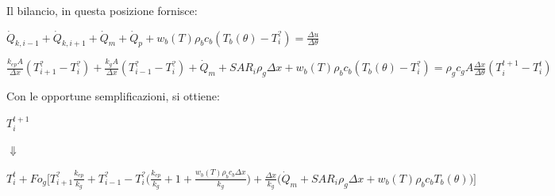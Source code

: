 Il bilancio, in questa posizione fornisce:
\begin{center}
	$ \Dot{Q} _{k, i-1} +\Dot{Q} _{k, i+1}+ \Dot{Q} _{m} +\Dot{Q} _{p}+ w_b (T) \rho _b c_b (T_b(\theta)-T_i ^?)= \frac{\Delta u}{\Delta \theta} $
\end{center}
\vspace{0.15cm}
\begin{center}
	$ \frac{k_{ep} A }{\Delta x}(T_{i+1} ^? - T_i ^? ) + \frac{k_g A }{\Delta x}(T_{i-1} ^? - T_i ^? )+ \Dot{Q} _{m} + SAR_i\rho _g \Delta x + w_b (T) \rho _b c_b (T_b(\theta)-T_i ^?) = \rho _{g} c_{g} A \frac{\Delta x}{ \Delta \theta}(T_i ^{t+1} - T_i ^t ) $
\end{center}
Con le opportune semplificazioni, si ottiene:
\begin{center}
	$T_i ^{t+1} $
\end{center}
\begin{center}
	$\Downarrow$
\end{center}
\begin{center}
	$T_i ^t + Fo_{g} \Bigg[ T_{i+1} ^? \frac{k_{ep}}{k_{g}} + T_{i-1} ^?- T_i ^? \Big(\frac{k_{ep}}{k_{g}} + 1 + \frac{ w_b (T) \rho _b c_b \Delta x }{k_{g}} \Big) + \frac{\Delta x }{k_{g}} \Big(\Dot{Q} _{m} +  SAR_i \rho _{g} \Delta x + w_b (T) \rho _b c_b T_b(\theta)\Big) \Bigg]$
\end{center}


